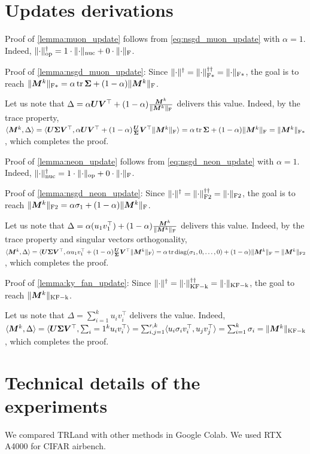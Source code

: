 \documentclass{article} %
\newcommand{\norm}[1]{\lVert #1\rVert}
\DeclarePairedDelimiter{\normf}{\|}{\|_\mathrm{F}}
\DeclarePairedDelimiter{\normkfk}{\|}{\|_\mathrm{KF-k}}
\DeclarePairedDelimiter{\normfstar}{\|}{\|_\mathrm{F*}}
\DeclarePairedDelimiter{\normftwo}{\|}{\|_\mathrm{F2}}
\DeclarePairedDelimiter{\norms}{\|}{\|_{\mathrm{op}}}
\DeclarePairedDelimiter{\normn}{\|}{\|_{\mathrm{nuc}}}
\def\<#1,#2>{\langle #1,#2\rangle}
\DeclareMathOperator{\tr}{tr}
\DeclareMathOperator{\diag}{diag}
\begin{document}
\section{Updates derivations}

Proof of \cref{lemma:muon_update} follows from \cref{eq:nsgd_muon_update} with $\alpha=1$. Indeed, $\norms{\cdot}^\dagger=1\cdot\normn{\cdot} + 0 \cdot \normf{\cdot} $.

Proof of \cref{lemma:nsgd_muon_update}:
Since $\norm{\cdot}^\dagger = \normfstar{\cdot}^{\dagger\dagger} = \normfstar{\cdot}$, the goal is to reach $\normfstar{\mM^k} = \alpha \tr{\mSigma} + (1-\alpha) \normf{\mM^k}$.

Let us note that $\Delta = \alpha \mU \mV^\top + (1-\alpha) \frac{\mM^k}{\normf{\mM^k}}$ delivers this value. Indeed, by the trace property, $\<\mM^k, \Delta> =\<\mU \mSigma \mV^\top, \alpha \mU \mV^\top + (1-\alpha) \frac{\mU \mSigma \mV^\top}{\normf{\mM^k}}> = \alpha \tr \mSigma + (1-\alpha) \normf{\mM^k} = \normfstar{\mM^k}$, which completes the proof.

Proof of \cref{lemma:neon_update} follows from \cref{eq:nsgd_neon_update} with $\alpha=1$. Indeed, $\normn{\cdot}^\dagger=1\cdot\norms{\cdot} + 0 \cdot \normf{\cdot} $.

Proof of \cref{lemma:nsgd_neon_update}:
Since $\norm{\cdot}^\dagger = \normftwo{\cdot}^{\dagger\dagger} = \normftwo{\cdot}$, the goal is to reach $\normftwo{\mM^k} = \alpha \sigma_1 + (1-\alpha) \normf{\mM^k}$.

Let us note that $\Delta = \alpha (u_1 v_1^\top) + (1-\alpha) \frac{\mM^k}{\normf{\mM^k}}$ delivers this value. Indeed, by the trace property and singular vectors orthogonality, $\<\mM^k, \Delta> =\<\mU \mSigma \mV^\top, \alpha u_1 v_1^\top + (1-\alpha) \frac{\mU \mSigma \mV^\top}{\normf{\mM^k}}> = \alpha \tr \diag({\sigma_1, 0, \dots, 0}) + (1-\alpha) \normf{\mM^k} = \normftwo{\mM^k}$, which completes the proof.


Proof of \cref{lemma:ky_fan_update}:
Since $\norm{\cdot}^\dagger = \normkfk{\cdot}^{\dagger\dagger} = \normkfk{\cdot}$, the goal to reach $\normkfk{\mM^k}$.

Let us note that $\Delta = \sum_{i=1}^{k} u_i v_i^\top$ delivers the value. Indeed, $\<\mM^k, \Delta> =\<\mU \mSigma \mV^\top, \sum_{i=1}^{k} u_i v_i^\top> = \sum_{i,j=1}^{r, k}\<u_i \sigma_i v_i^\top, u_j v_j^\top> = \sum_{i=1}^{k}\sigma_i = \normkfk{\mM^k}$, which completes the proof. 

\section{Technical details of the experiments}
We compared TRLand with other methods in Google Colab. We used RTX A4000 for CIFAR airbench.
\end{document}

